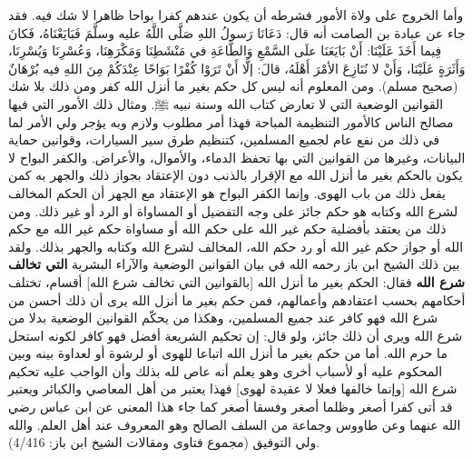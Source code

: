 وأما الخروج على ولاة الأمور فشرطه أن يكون عندهم كفرا بواحا ظاهرا لا شك فيه. فقد جاء عن عبادة بن الصامت أنه قال: دَعَانَا رَسولُ اللهِ صَلَّى اللَّهُ عليه وسلَّمَ فَبَايَعْنَاهُ، فَكانَ فِيما أَخَذَ عَلَيْنَا: أَنْ بَايَعَنَا علَى السَّمْعِ وَالطَّاعَةِ في مَنْشَطِنَا وَمَكْرَهِنَا، وَعُسْرِنَا وَيُسْرِنَا، وَأَثَرَةٍ عَلَيْنَا، وَأَنْ لا نُنَازِعَ الأمْرَ أَهْلَهُ، قالَ: إلَّا أَنْ تَرَوْا كُفْرًا بَوَاحًا عِنْدَكُمْ مِنَ اللهِ فيه بُرْهَانٌ {\footnotesize (صحيح مسلم)}. ومن المعلوم أنه ليس كل حكم بغير ما أنزل الله كفر ومن ذلك بلا شك القوانين الوضعية التي لا تعارض كتاب الله وسنة نبيه ﷺ. ومثال ذلك الأمور التي فيها مصالح الناس كالأمور التنظيمة المباحة فهذا أمر مطلوب ولازم وبه يؤجر ولي الأمر لما في ذلك من نفع عام لجميع المسلمين، كتنظيم طرق سير السيارات، وقوانين حماية البيانات، وغيرها من القوانين التي بها تحفظ الدماء، والأموال، والأعراض. والكفر البواح لا يكون بالحكم بغير ما أنزل الله مع الإقرار بالذنب دون الإعتقاد بجواز ذلك والجهر به كمن يفعل ذلك من باب الهوى. وإنما الكفر البواح هو الإعتقاد مع الجهر أن الحكم المخالف لشرع الله وكتابه هو حكم جائز على وجه التفضيل أو المساواة أو الرد أو غير ذلك. ومن ذلك من يعتقد بأفضلية حكم غير الله على حكم الله أو مساواة حكم غير الله مع حكم الله أو جواز حكم غير الله أو رد حكم الله، المخالف لشرع الله وكتابه والجهر بذلك. ولقد بين ذلك الشيخ ابن باز رحمه الله في بيان القوانين الوضعية والآراء البشرية \textbf{التي تخالف شرع الله} فقال: الحكم بغير ما أنزل الله [بالقوانين التي تخالف شرع الله] أقسام، تختلف أحكامهم بحسب اعتقادهم وأعمالهم، فمن حكم بغير ما أنزل الله يرى أن ذلك أحسن من شرع الله فهو كافر عند جميع المسلمين، وهكذا من يحكّم القوانين الوضعية بدلا من شرع الله ويرى أن ذلك جائز، ولو قال: إن تحكيم الشريعة أفضل فهو كافر لكونه استحل ما حرم الله. أما من حكم بغير ما أنزل الله اتباعا للهوى أو لرشوة أو لعداوة بينه وبين المحكوم عليه أو لأسباب أخرى وهو يعلم أنه عاص لله بذلك وأن الواجب عليه تحكيم شرع الله [وإنما خالفها فعلا لا عقيدة لهوى] فهذا يعتبر من أهل المعاصي والكبائر ويعتبر قد أتى كفرا أصغر وظلما أصغر وفسقا أصغر كما جاء هذا المعنى عن ابن عباس رضي الله عنهما وعن طاووس وجماعة من السلف الصالح وهو المعروف عند أهل العلم. والله ولي التوفيق {\footnotesize (مجموع فتاوى ومقالات الشيخ ابن باز: 4/416)}. 

